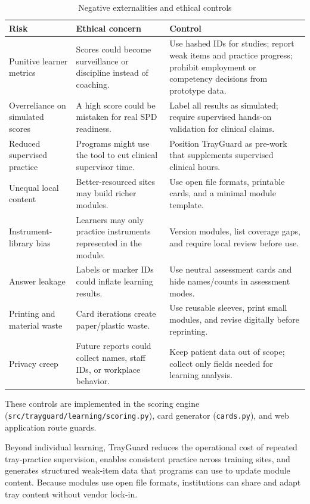 \documentclass[10pt,a4paper]{article}
\begin{document}
\begin{table}[H]
\centering
\caption{Negative externalities and ethical controls}
\label{tab:negative-externalities-and-ethical-controls}
\small\renewcommand{\arraystretch}{1.2}\setlength{\tabcolsep}{4pt}
\begin{tabularx}{\textwidth}{|>{\raggedright\arraybackslash}X|>{\raggedright\arraybackslash}X|>{\raggedright\arraybackslash}X|}
\hline
Risk & Ethical concern & Control \\
\hline
Punitive learner metrics & Scores could become surveillance or discipline instead of coaching. & Use hashed IDs for studies; report weak items and practice progress; prohibit employment or competency decisions from prototype data. \\
\hline
Overreliance on simulated scores & A high score could be mistaken for real SPD readiness. & Label all results as simulated; require supervised hands-on validation for clinical claims. \\
\hline
Reduced supervised practice & Programs might use the tool to cut clinical supervisor time. & Position TrayGuard as pre-work that supplements supervised clinical hours. \\
\hline
Unequal local content & Better-resourced sites may build richer modules. & Use open file formats, printable cards, and a minimal module template. \\
\hline
Instrument-library bias & Learners may only practice instruments represented in the module. & Version modules, list coverage gaps, and require local review before use. \\
\hline
Answer leakage & Labels or marker IDs could inflate learning results. & Use neutral assessment cards and hide names/counts in assessment modes. \\
\hline
Printing and material waste & Card iterations create paper/plastic waste. & Use reusable sleeves, print small modules, and revise digitally before reprinting. \\
\hline
Privacy creep & Future reports could collect names, staff IDs, or workplace behavior. & Keep patient data out of scope; collect only fields needed for learning analysis. \\
\hline
\end{tabularx}
\end{table}
These controls are implemented in the scoring engine
(\texttt{src/trayguard/learning/scoring.py}), card generator
(\texttt{cards.py}), and web application route guards.

Beyond individual learning, TrayGuard reduces the operational cost of
repeated tray-practice supervision, enables consistent practice across
training sites, and generates structured weak-item data that programs can
use to update module content. Because modules use open file formats,
institutions can share and adapt tray content without vendor lock-in.
\end{document}
